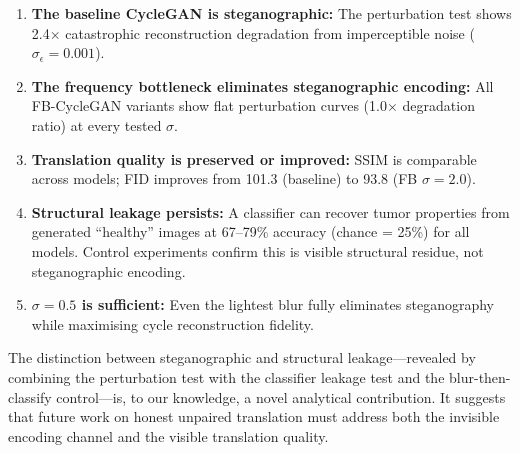 \documentclass[11pt,a4paper]{article}
\theoremstyle{definition}
\begin{document}
\begin{enumerate}
    \item \textbf{The baseline CycleGAN is steganographic:} The perturbation test shows 2.4$\times$ catastrophic reconstruction degradation from imperceptible noise ($\sigma_\epsilon = 0.001$).

    \item \textbf{The frequency bottleneck eliminates steganographic encoding:} All FB-CycleGAN variants show flat perturbation curves (1.0$\times$ degradation ratio) at every tested $\sigma$.

    \item \textbf{Translation quality is preserved or improved:} SSIM is comparable across models; FID improves from 101.3 (baseline) to 93.8 (FB $\sigma = 2.0$).

    \item \textbf{Structural leakage persists:} A classifier can recover tumor properties from generated ``healthy'' images at 67--79\% accuracy (chance = 25\%) for all models. Control experiments confirm this is visible structural residue, not steganographic encoding.

    \item \textbf{$\sigma = 0.5$ is sufficient:} Even the lightest blur fully eliminates steganography while maximising cycle reconstruction fidelity.
\end{enumerate}

The distinction between steganographic and structural leakage---revealed by combining the perturbation test with the classifier leakage test and the blur-then-classify control---is, to our knowledge, a novel analytical contribution. It suggests that future work on honest unpaired translation must address both the invisible encoding channel and the visible translation quality.
\end{document}
